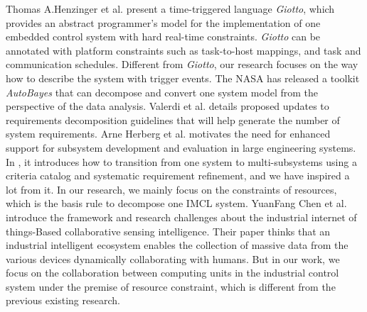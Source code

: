 Thomas A.Henzinger et al. present a time-triggered language \emph{Giotto}\cite{henzinger2001giotto}, which provides an abstract programmer's model for the implementation of one embedded control system with hard real-time constraints.
\emph{Giotto} can be annotated with platform constraints such as task-to-host mappings, and task and communication schedules. Different from \emph{Giotto}, our research focuses on the way how to describe the system with trigger events.
The NASA has released a toolkit \emph{AutoBayes}\cite{schumann2008autobayes} that can decompose and convert one system model from the perspective of the data analysis.
Valerdi et al.\cite{valerdi2010better} details proposed updates to requirements decomposition guidelines that will help generate the number of system requirements.
Arne Herberg et al.\cite{DBLP:conf/csdm/HerbergL13} motivates the need for enhanced support for subsystem development and evaluation in large engineering systems.
In \cite{DBLP:phd/de/Penzenstadler2010}, it introduces how to transition from one system to multi-subsystems using a criteria catalog and systematic requirement refinement, and we have inspired a lot from it. In our research, we mainly focus on the constraints of resources, which is the basis rule to decompose one IMCL system.
YuanFang Chen et al.\cite{s16020215} introduce the framework and research challenges about the industrial internet of things-Based collaborative sensing intelligence. Their paper thinks that an industrial intelligent ecosystem enables the collection of massive data from the various devices dynamically collaborating with humans. But in our work, we focus on the collaboration between computing units in the industrial control system under the premise of resource constraint, which is different from the previous existing research.



